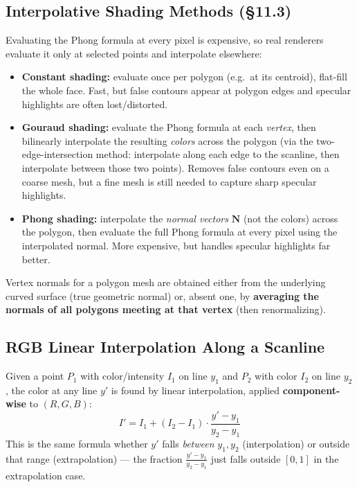 \documentclass[12pt, a4paper]{article}
\newenvironment{answerbox}{\begin{mdframed}[style=answerframe]}{\end{mdframed}}
\begin{document}
\subsection{Interpolative Shading Methods (\S11.3)}
\begin{answerbox}
Evaluating the Phong formula at every pixel is expensive, so real renderers evaluate it only at selected points and interpolate elsewhere:
\begin{itemize}[noitemsep]
  \item \textbf{Constant shading:} evaluate once per polygon (e.g.\ at its centroid), flat-fill the whole face. Fast, but false contours appear at polygon edges and specular highlights are often lost/distorted.
  \item \textbf{Gouraud shading:} evaluate the Phong formula at each \emph{vertex}, then bilinearly interpolate the resulting \emph{colors} across the polygon (via the two-edge-intersection method: interpolate along each edge to the scanline, then interpolate between those two points). Removes false contours even on a coarse mesh, but a fine mesh is still needed to capture sharp specular highlights.
  \item \textbf{Phong shading:} interpolate the \emph{normal vectors} $\mathbf{N}$ (not the colors) across the polygon, then evaluate the full Phong formula at every pixel using the interpolated normal. More expensive, but handles specular highlights far better.
\end{itemize}
Vertex normals for a polygon mesh are obtained either from the underlying curved surface (true geometric normal) or, absent one, by \textbf{averaging the normals of all polygons meeting at that vertex} (then renormalizing).
\end{answerbox}

\subsection{RGB Linear Interpolation Along a Scanline}
\begin{answerbox}
Given a point $P_1$ with color/intensity $I_1$ on line $y_1$ and $P_2$ with color $I_2$ on line $y_2$, the color at any line $y'$ is found by linear interpolation, applied \textbf{component-wise} to $(R,G,B)$:
$$I' = I_1 + (I_2-I_1)\cdot\frac{y'-y_1}{y_2-y_1}$$
This is the same formula whether $y'$ falls \emph{between} $y_1,y_2$ (interpolation) or outside that range (extrapolation) — the fraction $\frac{y'-y_1}{y_2-y_1}$ just falls outside $[0,1]$ in the extrapolation case.
\end{answerbox}
\end{document}
